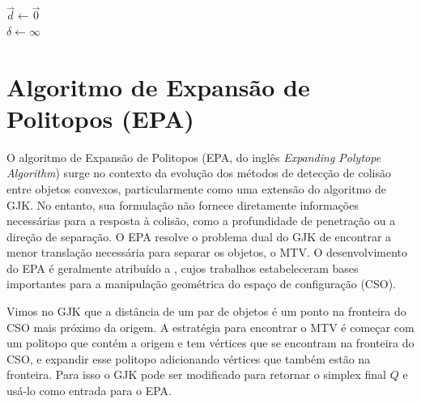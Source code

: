 \begin{algorithm}[htb]
	\caption{SAT com cálculo do MTV}
	$\vec d \leftarrow \vec 0$ \\
	$\delta \leftarrow \infty$ \\
	\label{alg:sat_mtv}
\end{algorithm}

\section{Algoritmo de Expansão de Politopos (EPA)}

O algoritmo de Expansão de Politopos (EPA, do inglês \textit{Expanding Polytope Algorithm}) surge no contexto da evolução dos métodos de detecção de colisão entre objetos convexos, particularmente como uma extensão do algoritmo de GJK. No entanto, sua formulação não fornece diretamente informações necessárias para a resposta à colisão, como a profundidade de penetração ou a direção de separação. O EPA resolve o problema dual do GJK de encontrar a menor translação necessária para separar os objetos, o MTV. O desenvolvimento do EPA é geralmente atribuído a , cujos trabalhos estabeleceram bases importantes para a manipulação geométrica do espaço de configuração (CSO). 

Vimos no GJK que a distância de um par de objetos é um ponto na fronteira do CSO mais próximo da origem. A estratégia para encontrar o MTV é começar com um politopo que contém a origem e tem vértices que se encontram na fronteira do CSO, e expandir esse politopo adicionando vértices que também estão na fronteira. Para isso o GJK pode ser modificado para retornar o simplex final $Q$ e usá-lo como entrada para o EPA. 

